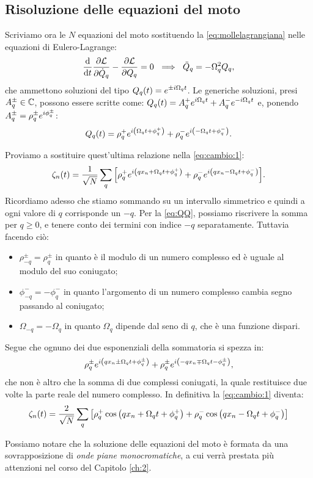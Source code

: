     \subsection{Risoluzione delle equazioni del moto}
        Scriviamo ora le $N$ equazioni del moto sostituendo la \eqref{eq:mollelagrangiana} nelle equazioni di Eulero-Lagrange:
            $$\lagrange{\LL}{Q_q}{\dot{Q}_q}=0\ \implies\ \ddot{Q}_q=-\Omega_q^2Q_q,$$
        che ammettono soluzioni del tipo $\displaystyle Q_q\qty(t)=e^{\pm i\Omega_qt}$. Le generiche soluzioni, presi $A_q^\pm\in\mathbb{C}$, possono essere scritte come: $\displaystyle Q_q\qty(t)=A_q^+e^{i\Omega_qt}+A_q^-e^{-i\Omega_qt}$ e, ponendo $\displaystyle A_q^\pm=\rho_q^\pm e^{i\phi_q^\pm}$:
            $$Q_q\qty(t)=\rho_q^+e^{i\qty(\Omega_qt+\phi_q^+)}+\rho_q^-e^{i\qty(-\Omega_qt+\phi_q^-)}.$$
        \par Proviamo a sostituire quest'ultima relazione nella \eqref{eq:cambio:1}:
            $$\zeta_n\qty(t)=\frac{1}{\sqrt{N}}\sum_q\qty[\rho_q^+e^{i\qty(qx_n+\Omega_qt+\phi_q^+)}+\rho_q^-e^{i\qty(qx_n-\Omega_qt+\phi_q^-)}].$$
        Ricordiamo adesso che stiamo sommando su un intervallo simmetrico e quindi a ogni valore di $q$ corrisponde un $-q$. Per la \eqref{eq:QQ}, possiamo riscrivere la somma per $q\geq 0$, e tenere conto dei termini con indice $-q$ separatamente. Tuttavia facendo ci\`o: 
        \begin{itemize}
            \item $\rho_{-q}^\pm=\rho_{q}^\pm$ in quanto \`e il modulo di un numero complesso ed \`e uguale al modulo del suo coniugato;
            \item $\phi_{-q}^-=-\phi_q^-$ in quanto l'argomento di un numero complesso cambia segno passando al coniugato;
            \item $\Omega_{-q}=-\Omega_q$ in quanto $\Omega_q$ dipende dal seno di $q$, che \`e una funzione dispari.
        \end{itemize}
        Segue che ognuno dei due esponenziali della sommatoria si spezza in:
            $$\rho_q^\pm e^{i\qty(qx_n\pm\Omega_qt+\phi_q^\pm)}+\rho_{q}^\pm e^{i\qty(-qx_n\mp\Omega_qt-\phi_{q}^\pm)},$$
        che non \`e altro che la somma di due complessi coniugati, la quale restituisce due volte la parte reale del numero complesso. In definitiva la \eqref{eq:cambio:1} diventa:
        \begin{equation}
            \zeta_n\qty(t)=\frac{2}{\sqrt{N}}\sum_q\qty[\rho_q^+\cos\qty(qx_n+\Omega_qt+\phi_q^+)+\rho_q^-\cos\qty(qx_n-\Omega_qt+\phi_q^-)]
        \end{equation}
        \par Possiamo notare che la soluzione delle equazioni del moto \`e formata da una sovrapposizione di \emph{onde piane monocromatiche}, a cui verr\`a prestata pi\`u attenzioni nel corso del Capitolo \ref{ch:2}.
